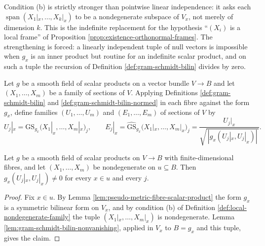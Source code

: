 Condition (b) is strictly stronger than pointwise linear independence: it asks each $\operatorname{span}(X_1|_x,\ldots,X_k|_x)$ to be a nondegenerate subspace of $V_x$, not merely of dimension $k$. This is the indefinite replacement for the hypothesis ``$(X_i)$ is a local frame'' of Proposition \ref{prop:existence-orthonormal-frames}. The strengthening is forced: a linearly independent tuple of null vectors is impossible when $g_x$ is an inner product but routine for an indefinite scalar product, and on such a tuple the recursion of Definition \ref{def:gram-schmidt-bilin} divides by zero.

\begin{definition}
\label{def:pseudo-gram-schmidt-frame}
\leanok
{}
Let $g$ be a smooth field of scalar products on a vector bundle $V \to B$ and let $(X_1,\ldots,X_m)$ be a family of sections of $V$. Applying Definitions \ref{def:gram-schmidt-bilin} and \ref{def:gram-schmidt-bilin-normed} in each fibre against the form $g_x$, define families $(U_1,\ldots,U_m)$ and $(E_1,\ldots,E_m)$ of sections of $V$ by
\[
U_j|_x = \mathrm{GS}_{g_x}\bigl(X_1|_x,\ldots,X_m|_x\bigr)_j , \qquad
E_j|_x = \widehat{\mathrm{GS}}_{g_x}\bigl(X_1|_x,\ldots,X_m|_x\bigr)_j = \frac{U_j|_x}{\sqrt{\,|g_x(U_j|_x, U_j|_x)|\,}} .
\]
\end{definition}

\begin{lemma}
\label{lem:pseudo-gram-schmidt-denominators}
\leanok
{}
Let $g$ be a smooth field of scalar products on $V \to B$ with finite-dimensional fibres, and let $(X_1,\ldots,X_m)$ be nondegenerate on $u \subseteq B$. Then $g_x(U_j|_x, U_j|_x) \neq 0$ for every $x \in u$ and every $j$.
\end{lemma}

\begin{proof}
\leanok
{}
Fix $x \in u$. By Lemma \ref{lem:pseudo-metric-fibre-scalar-product} the form $g_x$ is a symmetric bilinear form on $V_x$, and by condition (b) of Definition \ref{def:local-nondegenerate-family} the tuple $(X_1|_x,\ldots,X_m|_x)$ is nondegenerate. Lemma \ref{lem:gram-schmidt-bilin-nonvanishing}, applied in $V_x$ to $B = g_x$ and this tuple, gives the claim.
\end{proof}

